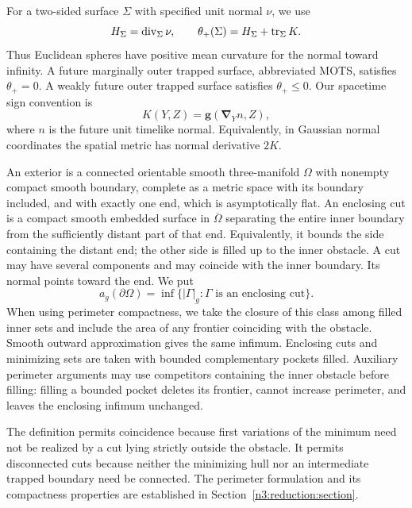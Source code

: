 For a two-sided surface \(\Sigma\) with specified unit normal \(\nu\),
we use
\[
 H_\Sigma=\operatorname{div}_\Sigma\nu,\qquad
 \theta_+(\Sigma)=H_\Sigma+\operatorname{tr}_\Sigma K.
\]
Thus Euclidean spheres have positive mean curvature for the normal
toward infinity. A future marginally outer trapped surface, abbreviated
MOTS, satisfies \(\theta_+=0\). A weakly future outer trapped surface
satisfies \(\theta_+\le0\). Our spacetime sign convention is
\begin{equation}\label{n3:intro:k-sign}
 K(Y,Z)=\mathbf g(\mathbf\nabla_Y n,Z),
\end{equation}
where \(n\) is the future unit timelike normal. Equivalently, in Gaussian
normal coordinates the spatial metric has normal derivative \(2K\).

\begin{definition}\label{n3:intro:exterior-class}
An exterior is a connected orientable smooth three-manifold \(\Omega\)
with nonempty compact smooth boundary, complete as a metric space with
its boundary included, and with exactly one end, which is asymptotically flat.
An enclosing cut is a compact smooth embedded surface in
\(\overline\Omega\) separating the entire inner boundary from the
sufficiently distant part of that end. Equivalently, it bounds the side
containing the distant end; the other side is filled up to the inner
obstacle. A cut may have several components and may coincide with the
inner boundary. Its normal points toward the end. We put
\[
 a_g(\partial\Omega)=
  \inf\{|\Gamma|_g:\Gamma\text{ is an enclosing cut}\}.
\]
When using perimeter compactness, we take the closure of this class
among filled inner sets and include the area of any frontier coinciding
with the obstacle. Smooth outward approximation gives the same
infimum. Enclosing cuts and minimizing sets are taken with bounded
complementary pockets filled. Auxiliary perimeter arguments may use
competitors containing the inner obstacle before filling: filling a bounded
pocket deletes its frontier, cannot increase perimeter, and leaves the enclosing
infimum unchanged.
\end{definition}

The definition permits coincidence because first variations of the
minimum need not be realized by a cut lying strictly outside the
obstacle. It permits disconnected cuts because neither the minimizing
hull nor an intermediate trapped boundary need be connected. The
perimeter formulation and its compactness properties are established
in Section~\ref{n3:reduction:section}.

